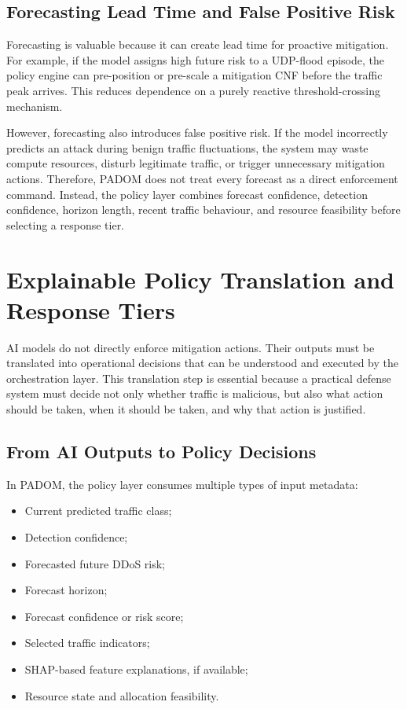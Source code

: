 \documentclass[12pt, a4paper, reqno, oneside]{book}
\newcommand{\padonap}{\textsc{PADOM}}
\begin{document}
\subsection{Forecasting Lead Time and False Positive Risk}
\label{subsec:forecast-leadtime-bg}

Forecasting is valuable because it can create lead time for proactive
mitigation. For example, if the model assigns high future risk to a UDP-flood
episode, the policy engine can pre-position or pre-scale a mitigation CNF
before the traffic peak arrives. This reduces dependence on a purely reactive
threshold-crossing mechanism.

However, forecasting also introduces false positive risk. If the model
incorrectly predicts an attack during benign traffic fluctuations, the system
may waste compute resources, disturb legitimate traffic, or trigger unnecessary
mitigation actions. Therefore, \padonap{} does not treat every forecast as a
direct enforcement command. Instead, the policy layer combines forecast
confidence, detection confidence, horizon length, recent traffic behaviour, and
resource feasibility before selecting a response tier.

\section{Explainable Policy Translation and Response Tiers}
\label{sec:policy-bg}

AI models do not directly enforce mitigation actions. Their outputs must be
translated into operational decisions that can be understood and executed by
the orchestration layer. This translation step is essential because a practical
defense system must decide not only whether traffic is malicious, but also
what action should be taken, when it should be taken, and why that action is
justified.

\subsection{From AI Outputs to Policy Decisions}
\label{subsec:ai-to-policy-bg}

In \padonap{}, the policy layer consumes multiple types of input metadata:

\begin{itemize}
    \item Current predicted traffic class;
    \item Detection confidence;
    \item Forecasted future DDoS risk;
    \item Forecast horizon;
    \item Forecast confidence or risk score;
    \item Selected traffic indicators;
    \item SHAP-based feature explanations, if available;
    \item Resource state and allocation feasibility.
\end{itemize}
\end{document}
